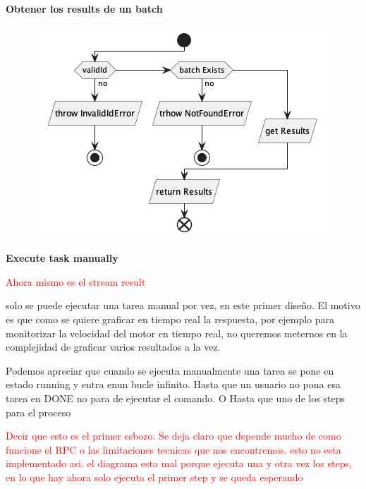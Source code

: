 \textbf{Obtener los results de un batch}

\begin{figure}[H]
    \centering
    \includegraphics[height=0.2\textheight]{./part/Proyecto_ejecutivo/memoria_descriptiva/descripcionDelProyecto/manager/uml/getBatchResultsUseCase}
    \caption[Diagrama de objetos de dominio]{}\label{fig:getBatchResultsUseCase}
\end{figure}

\textbf{Execute task manually}

\textcolor{red}{Ahora mismo es el stream result}

solo se puede ejecutar una tarea manual por vez, en este primer diseño. El motivo es que como se quiere graficar en tiempo real la respuesta, por ejemplo para monitorizar la velocidad del motor en tiempo real, no queremos meternos en la complejidad de graficar varios resultados a la vez.

Podemos apreciar que cuando se ejecuta manualmente una tarea se pone en estado running y entra enun bucle infinito. Hasta que un usuario no pona esa tarea en DONE no para de ejecutar el comando. O Hasta que uno de los steps para el proceso

\textcolor{red}{Decir que esto es el primer esbozo. Se deja claro que depende mucho de como funcione el RPC o las limitaciones tecnicas que nos encontremos. esto no esta implementado asi. el diagrama esta mal porque ejecuta una y otra vez los steps, en lo que hay ahora solo ejecuta el primer step y se queda esperando}

